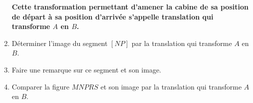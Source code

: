 \begin{activite}[La cabine]
\begin{enumerate}
        \smallskip
        {\bfseries Cette transformation permettant d'amener la cabine de sa position de départ à sa position d'arrivée s'appelle translation qui transforme $A$ en $B$.}
        \smallskip
        \item Déterminer l'image du segment $[NP]$ par la translation qui transforme $A$ en $B$.
        \item Faire une remarque sur ce segment et son image.
        \item Comparer la figure $MNPRS$ et son image par la translation qui transforme $A$ en $B$.
    \end{enumerate}
\end{activite}
